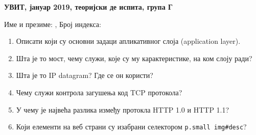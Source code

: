 \documentclass[a4paper]{article}
\begin{document}
\begin{center}
\textbf{УВИТ, јануар 2019, теоријски де испита, група Г}  
\end{center}

Име и презиме: \hrulefill, Број индекса: \hrulefill

\begin{enumerate}

\item Описати који су основни задаци апликативног слоја (application layer). \hrulefill

\hrulefill

\hrulefill

\hrulefill

\hrulefill


\item Шта је то мост, чему служи, које су му карактеристике, на ком слоју ради? \hrulefill

\hrulefill

\hrulefill

\hrulefill

\hrulefill


\item Шта је то IP datagram? Где се он користи?\hrulefill

\hrulefill

\hrulefill

\hrulefill

\hrulefill

\item Чему служи контрола загушења код TCP протокола?\hrulefill

\hrulefill

\hrulefill

\hrulefill

\hrulefill


\item У чему је највећа разлика између протокла HTTP 1.0 и HTTP 1.1?\hrulefill

\hrulefill

\hrulefill

\hrulefill

\hrulefill


\item Који елементи на веб страни су изабрани селектором \verb|p.small img#desc|? \hrulefill

\hrulefill

\hrulefill

\hrulefill

\hrulefill



\end{enumerate}
\end{document}
